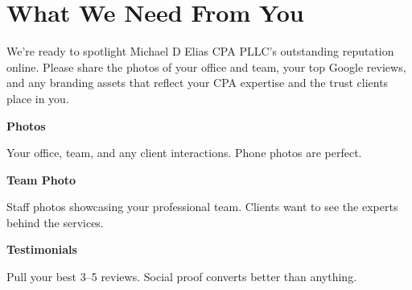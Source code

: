 \documentclass[11pt,letterpaper]{article}
\begin{document}
\vspace{0.2em}

\section*{What We Need From You}

We’re ready to spotlight Michael D Elias CPA PLLC’s outstanding reputation online. Please share the photos of your office and team, your top Google reviews, and any branding assets that reflect your CPA expertise and the trust clients place in you.

\vspace{0.12em}

\noindent\begin{minipage}[t]{0.48\textwidth}
\begin{tcolorbox}[colframe=accent-teal, boxrule=1pt, left=0.7em, right=0.7em, top=0.5em, bottom=0.5em, arc=4pt, boxsep=0pt]
{\bfseries\small\color{accent-teal}Photos}

\vspace{0.15em}

{\small Your office, team, and any client interactions. Phone photos are perfect.}
\end{tcolorbox}

\vspace{0.1em}

\begin{tcolorbox}[colframe=accent-teal, boxrule=1pt, left=0.7em, right=0.7em, top=0.5em, bottom=0.5em, arc=4pt, boxsep=0pt]
{\bfseries\small\color{accent-teal}Team Photo}

\vspace{0.15em}

{\small Staff photos showcasing your professional team. Clients want to see the experts behind the services.}
\end{tcolorbox}

\vspace{0.1em}

\begin{tcolorbox}[colframe=accent-teal, boxrule=1pt, left=0.7em, right=0.7em, top=0.5em, bottom=0.5em, arc=4pt, boxsep=0pt]
{\bfseries\small\color{accent-teal}Testimonials}

\vspace{0.15em}

{\small Pull your best 3–5 reviews. Social proof converts better than anything.}
\end{tcolorbox}
\end{minipage}
\end{document}
